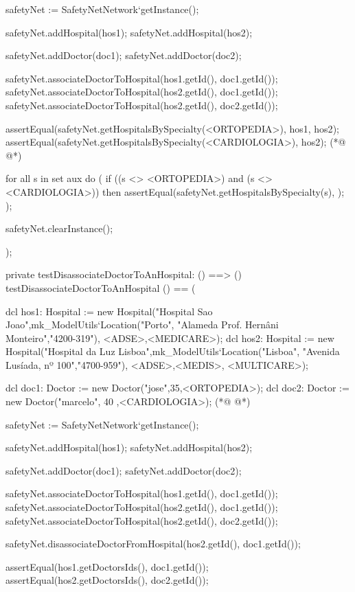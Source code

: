\begin{vdmpp}[breaklines=true]
  safetyNet := SafetyNetNetwork`getInstance();
   
  safetyNet.addHospital(hos1);
  safetyNet.addHospital(hos2);
  
  safetyNet.addDoctor(doc1);
  safetyNet.addDoctor(doc2);

  safetyNet.associateDoctorToHospital(hos1.getId(), doc1.getId());
  safetyNet.associateDoctorToHospital(hos2.getId(), doc1.getId());
  safetyNet.associateDoctorToHospital(hos2.getId(), doc2.getId());
  
  assertEqual(safetyNet.getHospitalsBySpecialty(<ORTOPEDIA>), {hos1, hos2});
  assertEqual(safetyNet.getHospitalsBySpecialty(<CARDIOLOGIA>), {hos2});
(*@
\label{testGetHospitalsByLocation:315}
@*)
  
  for all s in set aux do (
   if ((s <> <ORTOPEDIA>) and (s <> <CARDIOLOGIA>)) then
    assertEqual(safetyNet.getHospitalsBySpecialty(s), {});
  );
  
  safetyNet.clearInstance();
 
 );


private testDisassociateDoctorToAnHospital: () ==> ()
 testDisassociateDoctorToAnHospital () == (
 
  dcl hos1: Hospital := new Hospital("Hospital Sao Joao",mk_ModelUtils`Location("Porto", "Alameda Prof. Hernâni Monteiro","4200-319"), {<ADSE>,<MEDICARE>});
  dcl hos2: Hospital := new Hospital("Hospital da Luz Lisboa",mk_ModelUtils`Location("Lisboa", "Avenida Lusíada, nº 100","4700-959"), {<ADSE>,<MEDIS>, <MULTICARE>});  
  
  dcl doc1: Doctor := new Doctor("jose",35,<ORTOPEDIA>);
  dcl doc2: Doctor := new Doctor("marcelo", 40 ,<CARDIOLOGIA>);
(*@
\label{testGetHospitalsByAgreement:334}
@*)
  
  safetyNet := SafetyNetNetwork`getInstance();
   
  safetyNet.addHospital(hos1);
  safetyNet.addHospital(hos2);
  
  safetyNet.addDoctor(doc1);
  safetyNet.addDoctor(doc2);

  safetyNet.associateDoctorToHospital(hos1.getId(), doc1.getId());
  safetyNet.associateDoctorToHospital(hos2.getId(), doc1.getId());
  safetyNet.associateDoctorToHospital(hos2.getId(), doc2.getId());
  
  
  safetyNet.disassociateDoctorFromHospital(hos2.getId(), doc1.getId());

  assertEqual(hos1.getDoctorsIds(), {doc1.getId()});
  assertEqual(hos2.getDoctorsIds(), {doc2.getId()});
  

\end{vdmpp}
